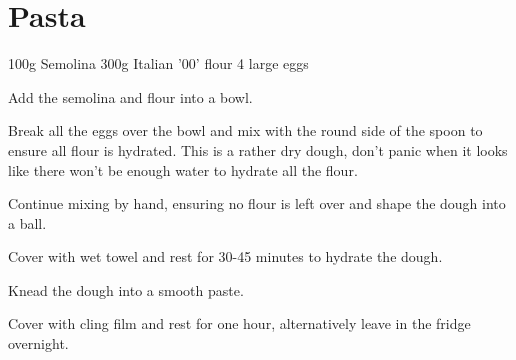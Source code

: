 \chapter{Pasta}
\minitoc

\label{rec:egg-pasta}

\begin{ingreds}
	100g Semolina
	300g Italian '00' flour
	4 large eggs
\end{ingreds}

\begin{method}		
     	Add the semolina and flour into a bowl.

	Break all the eggs over the bowl and mix with the round side of the spoon to ensure all flour is hydrated.  This is a rather dry dough, don't panic when it looks like there won't be enough water to hydrate all the flour.

	Continue mixing by hand, ensuring no flour is left over and shape the dough into a ball.

	Cover with wet towel and rest for 30-45 minutes to hydrate the dough.

	Knead the dough into a smooth paste.

	Cover with cling film and rest for one hour, alternatively leave in the fridge overnight.

\end {method}




